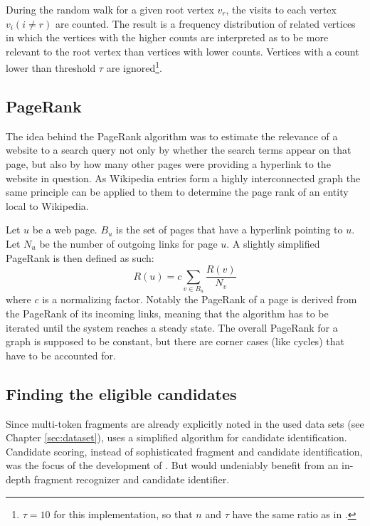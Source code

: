 \documentclass[runningheads,a4paper]{llncs}
\begin{document}
{During the random walk for a given root vertex $v_r$, the visits to each vertex $v_i (i \neq r)$ are counted. The result is a frequency distribution of related vertices in which the vertices with the higher counts are interpreted as to be more relevant to the root vertex than vertices with lower counts. Vertices with a count lower than threshold $\tau$ are ignored\footnote{$\tau = 10$ for this implementation, so that $n$ and $\tau$ have the same ratio as in \cite{Babelfy}.}.

\subsection{PageRank}\label{sec:pagerank}
The idea behind the PageRank\cite{pageRank} algorithm was to estimate the relevance of a website to a search query not only by whether the search terms appear on that page, but also by how many other pages were providing a hyperlink to the website in question. As Wikipedia entries form a highly interconnected graph the same principle can be applied to them to determine the page rank of an entity local to Wikipedia.

Let $u$ be a web page. $B_u$ is the set of pages that have a hyperlink pointing to $u$. Let $N_u$ be the number of outgoing links for page $u$. A slightly simplified PageRank is then defined as such: 
$$R(u) = c \sum_{v \in B_u} \frac{R(v)}{N_v}$$
where $c$ is a normalizing factor. Notably the PageRank of a page is derived from the PageRank of its incoming links, meaning that the algorithm has to be iterated until the system reaches a steady state. The overall PageRank for a graph is supposed to be constant, but there are corner cases (like cycles) that have to be accounted for. 

%

\subsection{Finding the eligible candidates}
Since multi-token fragments are already explicitly noted in the used data sets (see Chapter \ref{sec:dataset}), {\acronym} uses a simplified algorithm for candidate identification. Candidate scoring, instead of sophisticated fragment and candidate identification, was the focus of the development of {\acronym}. But {\acronym} would undeniably benefit from an in-depth fragment recognizer and candidate identifier.

}
\end{document}
